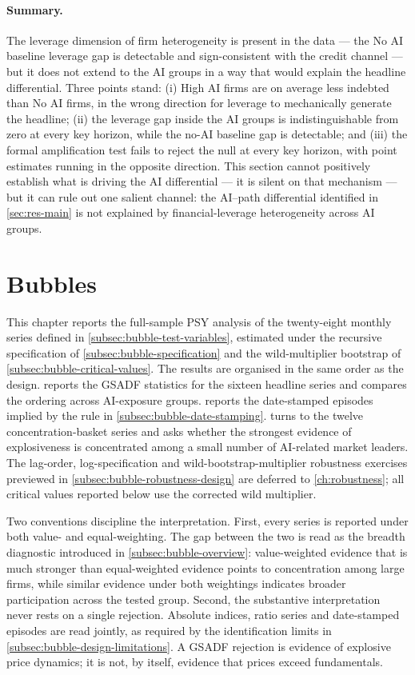 \paragraph{Summary.} The leverage dimension of firm heterogeneity is
present in the data --- the No AI baseline leverage gap is
detectable and sign-consistent with the credit channel --- but it
does not extend to the AI groups in a way that would explain the
headline differential. Three points stand: (i) High AI firms are on
average less indebted than No AI firms, in the wrong direction for
leverage to mechanically generate the headline; (ii) the leverage
gap inside the AI groups is indistinguishable from zero at every key
horizon, while the no-AI baseline gap is detectable; and (iii) the
formal amplification test fails to reject the null at every key
horizon, with point estimates running in the opposite direction.
This section cannot positively establish what is driving the AI
differential --- it is silent on that mechanism --- but it can rule
out one salient channel: the AI--path differential identified in
\cref{sec:res-main} is not explained by financial-leverage
heterogeneity across AI groups.


\section{Bubbles}
 
This chapter reports the full-sample PSY analysis of the twenty-eight monthly series defined in \cref{subsec:bubble-test-variables}, estimated under the recursive specification of \cref{subsec:bubble-specification} and the wild-multiplier bootstrap of \cref{subsec:bubble-critical-values}. The results are organised in the same order as the design.  reports the GSADF statistics for the sixteen headline series and compares the ordering across AI-exposure groups.  reports the date-stamped episodes implied by the rule in \cref{subsec:bubble-date-stamping}.  turns to the twelve concentration-basket series and asks whether the strongest evidence of explosiveness is concentrated among a small number of AI-related market leaders. The lag-order, log-specification and wild-bootstrap-multiplier robustness exercises previewed in \cref{subsec:bubble-robustness-design} are deferred to \cref{ch:robustness}; all critical values reported below use the corrected wild multiplier.
 
Two conventions discipline the interpretation. First, every series is reported under both value- and equal-weighting. The gap between the two is read as the breadth diagnostic introduced in \cref{subsec:bubble-overview}: value-weighted evidence that is much stronger than equal-weighted evidence points to concentration among large firms, while similar evidence under both weightings indicates broader participation across the tested group. Second, the substantive interpretation never rests on a single rejection. Absolute indices, ratio series and date-stamped episodes are read jointly, as required by the identification limits in \cref{subsec:bubble-design-limitations}. A GSADF rejection is evidence of explosive price dynamics; it is not, by itself, evidence that prices exceed fundamentals.
 
